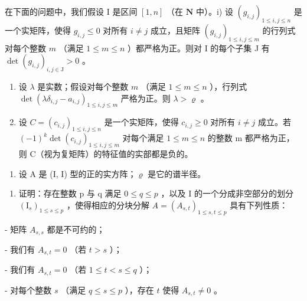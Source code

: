 在下面的问题中，我们假设 \(\mathrm{I}\) 是区间 \([1,n]\) （在 \(\mathbf{N}\) 中）。i) 设 \((g_{i,j})_{1\leqslant i,j\leqslant n}\) 是一个实矩阵，使得 \(g_{i,j}\leqslant0\) 对所有 \(i\neq j\) 成立，且矩阵 \((g_{i,j})_{1\leqslant i,j\leqslant m}\) 的行列式对每个整数 \(m\) （满足 \(1\leqslant m\leqslant n\) ）都严格为正。则对 I 的每个子集 J 有 \(\det(g_{i,j})_{i,j\in\mathrm{J}}>0\) 。

\begin{enumerate}
\def\labelenumi{\alph{enumi})}
\setcounter{enumi}{9}
\item
  设 \(\lambda\) 是实数；假设对每个整数 \(m\) （满足 \(1 \leqslant m \leqslant n\) ），行列式 \(\det(\lambda \delta_{i,j} - a_{i,j})_{1 \leqslant i,j \leqslant m}\) 严格为正。则 \(\lambda > \varrho\) 。
\item
  设 \(C = (c_{i,j})_{1 \leqslant i,j \leqslant n}\) 是一个实矩阵，使得 \(c_{i,j} \geqslant 0\) 对所有 \(i \neq j\) 成立。若 \((-1)^{k} \det(c_{i,j})_{1 \leqslant i,j \leqslant m}\) 对每个满足 \(1 \leqslant m \leqslant n\) 的整数 m 都严格为正，则 C（视为复矩阵）的特征值的实部都是负的。
\end{enumerate}

\begin{enumerate}
\def\labelenumi{\arabic{enumi})}
\setcounter{enumi}{20}
\tightlist
\item
  设 A 是 (I, I) 型的正的实方阵；\(\varrho\) 是它的谱半径。
\end{enumerate}

\begin{enumerate}
\def\labelenumi{\alph{enumi})}
\tightlist
\item
  证明：存在整数 p 与 q 满足 \(0 \leqslant q \leqslant p\) ，以及 I 的一个分成非空部分的划分 \((\mathrm{I}_{s})_{1 \leqslant s \leqslant p}\) ，使得相应的分块分解 \(A = (A_{s,t})_{1 \leqslant s, t \leqslant p}\) 具有下列性质：
\end{enumerate}

- 矩阵 \(A_{s,s}\) 都是不可约的；

- 我们有 \(A_{s,t} = 0\) （若 \(t > s\) ）；

- 我们有 \(A_{s,t} = 0\) （若 \(1 \leqslant t < s \leqslant q\) ）；

- 对每个整数 \(s\) （满足 \(q \leqslant s \leqslant p\) ），存在 \(t\) 使得 \(A_{s,t} \neq 0\) 。


